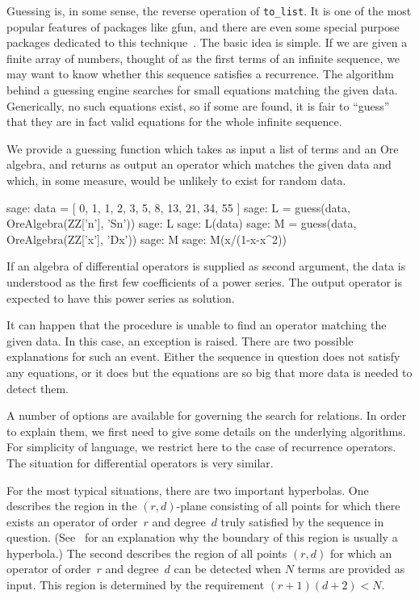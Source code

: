 \documentclass{amsart}
\begin{document}
Guessing is, in some sense, the reverse operation of \verb|to_list|. It is one
of the most popular features of packages like gfun, and there are even some
special purpose packages dedicated to this technique~\cite{kauers09a,hebisch11}.
The basic idea is simple. If we are given a finite array of numbers, thought of
as the first terms of an infinite sequence, we may want to know whether this
sequence satisfies a recurrence. The algorithm behind a guessing engine searches
for small equations matching the given data.  Generically, no such equations
exist, so if some are found, it is fair to ``guess'' that they are in fact valid
equations for the whole infinite sequence.

We provide a guessing function which takes as input a list of terms and an Ore
algebra, and returns as output an operator which matches the given data and
which, in some measure, would be unlikely to exist for random data.

\begin{sageexample}
  sage: data = [ 0, 1, 1, 2, 3, 5, 8, 13, 21, 34, 55 ]
  sage: L = guess(data, OreAlgebra(ZZ['n'], 'Sn'))
  sage: L
  sage: L(data)
  sage: M = guess(data, OreAlgebra(ZZ['x'], 'Dx'))
  sage: M
  sage: M(x/(1-x-x^2))
\end{sageexample}

If an algebra of differential operators is supplied as second argument, the data
is understood as the first few coefficients of a power series. The output
operator is expected to have this power series as solution.

It can happen that the procedure is unable to find an operator matching the 
given data. In this case, an exception is raised. There are two possible 
explanations for such an event. Either the sequence in question does not 
satisfy any equations, or it does but the equations are so big that more
data is needed to detect them. 

A number of options are available for governing the search for relations.  In
order to explain them, we first need to give some details on the underlying
algorithms. For simplicity of language, we restrict here to the case of
recurrence operators. The situation for differential operators is very similar.

For the most typical situations, there are two important hyperbolas. One
describes the region in the $(r,d)$-plane consisting of all points for which
there exists an operator of order~$r$ and degree~$d$ truly satisfied by the
sequence in question. (See~\cite{jaroschek13a} for an explanation why the
boundary of this region is usually a hyperbola.) The second describes the region
of all points $(r,d)$ for which an operator of order~$r$ and degree~$d$ can be
detected when $N$ terms are provided as input. This region is determined by the
requirement $(r+1)(d+2)<N$.
\end{document}
